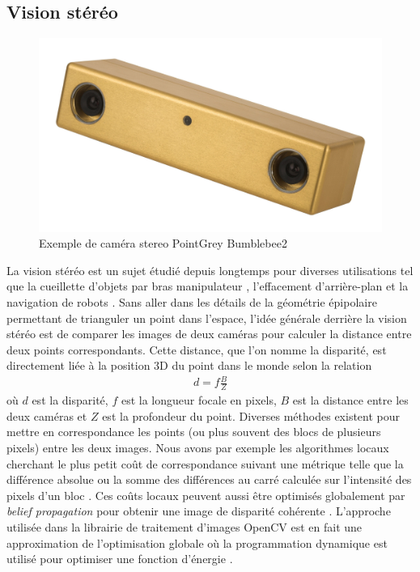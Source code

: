 \subsection{Vision stéréo}\label{subsec:stereo_vision}

\begin{figure}[h]
  \centering
  \includegraphics[width=0.5\linewidth]{images/bumblebee2.jpg}
  \caption[Exemple de caméra stereo]{Exemple de caméra stereo PointGrey Bumblebee2}
  \label{fig:stereo_camera}
\end{figure}

La vision stéréo est un sujet étudié depuis longtemps pour diverses utilisations tel que la cueillette d'objets par bras manipulateur \citep{Hernandez2017}, l'effacement d'arrière-plan \citep{Kanade1996Stereo} et la navigation de robots \citep{Fraundorfer2012}. Sans aller dans les détails de la géométrie épipolaire permettant de trianguler un point dans l'espace, l'idée générale derrière la vision stéréo est de comparer les images de deux caméras pour calculer la distance entre deux points correspondants. Cette distance, que l'on nomme la disparité, est directement liée à la position 3D du point dans le monde selon la relation
\begin{align}
  d = f \frac{B}{Z}
\end{align}
où $d$ est la disparité, $f$ est la longueur focale en pixels, $B$ est la distance entre les deux caméras et $Z$ est la profondeur du point. Diverses méthodes existent pour mettre en correspondance les points (ou plus souvent des blocs de plusieurs pixels) entre les deux images. Nous avons par exemple les algorithmes locaux cherchant le plus petit coût de correspondance suivant une métrique telle que la différence absolue ou la somme des différences au carré calculée sur l'intensité des pixels d'un bloc \citep{Szeliski2011}. Ces coûts locaux peuvent aussi être optimisés globalement par \textit{belief propagation} pour obtenir une image de disparité cohérente \citep{Klaus2006}. L'approche utilisée dans la librairie de traitement d'images OpenCV est en fait une approximation de l'optimisation globale où la programmation dynamique est utilisé pour optimiser une fonction d'énergie \citep{Hirschmuller2008}.

